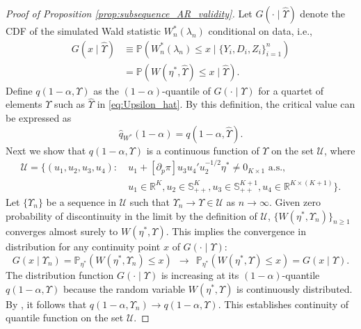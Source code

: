 \documentclass[11pt]{article}
\theoremstyle{definition}
\newcommand{\R}{\ensuremath{\mathbb{R}}}
\newcommand{\Prob}{\ensuremath{\mathbb{P}}} %
\newcommand{\0}{\ensuremath{\mathbf{0}}}
\begin{document}
\begin{bibunit}
\begin{proof}[Proof of Proposition \ref{prop:subsequence_AR_validity}]
Let $G(\cdot\mid \hat{\Upsilon})$ denote the CDF of the simulated Wald statistic $W_n^*(\lambda_n)$ conditional on data, i.e.,
\begin{align*}
    G(x\mid \hat{\Upsilon}) 
    &\equiv \Prob(W_n^*(\lambda_n) \leq x \mid \{Y_i, D_i, Z_i\}_{i=1}^n) \\
    &= \Prob(W(\eta^*, \hat{\Upsilon}) \leq x\mid \hat{\Upsilon}).
\end{align*}
Define $q(1-\alpha,\Upsilon)$ as the $(1-\alpha)$-quantile of $G(\cdot \mid \Upsilon)$ for a quartet of elements $\Upsilon$ such as $\hat{\Upsilon}$ in \eqref{eq:Upsilon_hat}. By this definition, the critical value can be expressed as 
\[
    \hat{q}_{W^*}(1-\alpha) = q(1-\alpha,\hat{\Upsilon}).
\]
Next we show that $q(1-\alpha,\Upsilon)$
is a continuous function of $\Upsilon$ on the set $\mathcal{U}$, where
\begin{equation}
    \label{eq:defn_set_C}
    \begin{aligned}
    \mathcal{U} = 
    \{(u_1, u_2, u_3, u_4):~ 
    & u_1 + [\partial_p \pi]u_3u_4'u_2^{-1/2}\eta^* \neq 0_{K\times 1} \text{ a.s.},  \\
    & u_1\in\R^K, u_2 \in \mathbb{S}^{K}_{++}, u_3 \in \mathbb{S}^{K+1}_{++}, u_4 \in \R^{K\times (K+1)}\}.
    \end{aligned}
\end{equation}
Let $\{\Upsilon_n\}$ be a sequence in $\mathcal{U}$ such that $\Upsilon_n \to \Upsilon \in \mathcal{U}$ as $n\to \infty$. Given zero probability of discontinuity in the limit by the definition of $\mathcal{U}$, $\{W(\eta^*,\Upsilon_n)\}_{n \geq 1}$ converges almost surely to $W(\eta^*,\Upsilon)$. This implies the convergence in distribution for any continuity point $x$ of $G(\cdot\mid \Upsilon)$:
\[
    G(x\mid \Upsilon_n) = \Prob_{\eta^*}(W(\eta^*,\Upsilon_n) \leq x) ~~\to~~ \Prob_{\eta^*}(W(\eta^*,\Upsilon) \leq x) = G(x \mid \Upsilon).
\]
The distribution function $G(\cdot\mid \Upsilon)$ is increasing at its $(1-\alpha)$-quantile $q(1-\alpha,\Upsilon)$ because the random variable $W(\eta^*, \Upsilon)$ is continuously distributed. By \citet[Lemma 5]{andrews/guggenberger:2010}, it follows that $q(1-\alpha,\Upsilon_n) \to q(1-\alpha,\Upsilon)$. This establishes continuity of quantile function on the set $\mathcal{U}$.


\end{proof}
\end{bibunit}
\end{document}

